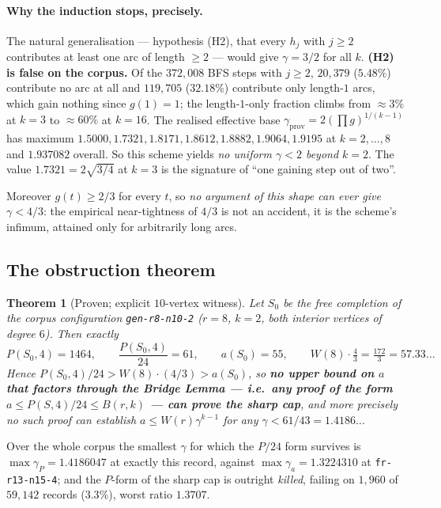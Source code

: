 \documentclass[11pt]{article}
\newtheorem{theorem}{Theorem}[section]
\theoremstyle{definition}
\begin{document}
\paragraph{Why the induction stops, precisely.} The natural generalisation ---
hypothesis (H2), that every $h_j$ with $j\ge2$ contributes at least one arc of length
$\ge2$ --- would give $\gamma=3/2$ for all $k$. \textbf{(H2) is false on the corpus.}
Of the $372{,}008$ BFS steps with $j\ge2$, $20{,}379$ ($5.48\%$) contribute no arc at
all and $119{,}705$ ($32.18\%$) contribute only length-$1$ arcs, which gain nothing
since $g(1)=1$; the length-$1$-only fraction climbs from $\approx3\%$ at $k=3$ to
$\approx60\%$ at $k=16$. The realised effective base
$\gamma_{\text{prov}} = 2(\prod g)^{1/(k-1)}$ has maximum
$1.5000, 1.7321, 1.8171, 1.8612, 1.8882, 1.9064, 1.9195$ at $k=2,\dots,8$ and
$1.937082$ overall. So this scheme yields \emph{no uniform $\gamma<2$ beyond $k=2$}.
The value $1.7321 = 2\sqrt{3/4}$ at $k=3$ is the signature of ``one gaining step out
of two''.

Moreover $g(t)\ge 2/3$ for every $t$, so \emph{no argument of this shape can ever
give $\gamma < 4/3$}: the empirical near-tightness of $4/3$ is not an accident, it is
the scheme's infimum, attained only for arbitrarily long arcs.

\subsection{The obstruction theorem}

\begin{theorem}[Proven; explicit $10$-vertex witness]
\label{thm:obstruction}
Let $S_0$ be the free completion of the corpus configuration
\texttt{gen-r8-n10-2} ($r=8$, $k=2$, both interior vertices of degree $6$). Then
exactly
\[
   P(S_0,4) = 1464, \qquad \frac{P(S_0,4)}{24} = 61, \qquad a(S_0) = 55,
   \qquad W(8)\cdot\tfrac43 = \tfrac{172}{3} = 57.33\ldots
\]
Hence $P(S_0,4)/24 > W(8)\cdot(4/3) > a(S_0)$, so \textbf{no upper bound on $a$ that
factors through the Bridge Lemma --- i.e.\ any proof of the form
$a \le P(S,4)/24 \le B(r,k)$ --- can prove the sharp cap}, and more precisely no such
proof can establish $a \le W(r)\gamma^{k-1}$ for any
$\gamma < 61/43 = 1.4186\ldots$
\end{theorem}

Over the whole corpus the smallest $\gamma$ for which the $P/24$ form survives is
$\max\gamma_P = 1.4186047$ at exactly this record, against $\max\gamma_a = 1.3224310$
at \texttt{fr-r13-n15-4}; and the $P$-form of the sharp cap is outright \emph{killed},
failing on $1{,}960$ of $59{,}142$ records ($3.3\%$), worst ratio $1.3707$.
\end{document}
